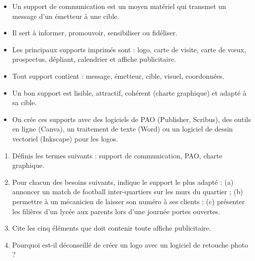 \documentclass[11pt]{article}
\newcommand{\cle}[1]{{\popxbold\color{popdark}#1}}
\begin{document}
\begin{aretenir}
\begin{itemize}
  \item Un \cle{support de communication} est un moyen matériel qui transmet un message d'un émetteur à une cible.
  \item Il sert à \cle{informer}, \cle{promouvoir}, \cle{sensibiliser} ou \cle{fidéliser}.
  \item Les principaux supports imprimés sont : logo, carte de visite, carte de vœux, prospectus, dépliant, calendrier et affiche publicitaire.
  \item Tout support contient : message, émetteur, cible, visuel, coordonnées.
  \item Un bon support est \cle{lisible}, \cle{attractif}, \cle{cohérent} (charte graphique) et \cle{adapté à sa cible}.
  \item On crée ces supports avec des logiciels de \cle{PAO} (Publisher, Scribus), des outils en ligne (Canva), un traitement de texte (Word) ou un logiciel de dessin vectoriel (Inkscape) pour les logos.
\end{itemize}
\end{aretenir}

\begin{exercice}
\begin{enumerate}
  \item Définis les termes suivants : support de communication, PAO, charte graphique.
  \item Pour chacun des besoins suivants, indique le support le plus adapté : (a) annoncer un match de football inter-quartiers sur les murs du quartier ; (b) permettre à un mécanicien de laisser son numéro à ses clients ; (c) présenter les filières d'un lycée aux parents lors d'une journée portes ouvertes.
  \item Cite les cinq éléments que doit contenir toute affiche publicitaire.
  \item Pourquoi est-il déconseillé de créer un logo avec un logiciel de retouche photo ?
\end{enumerate}
\end{exercice}
\end{document}
